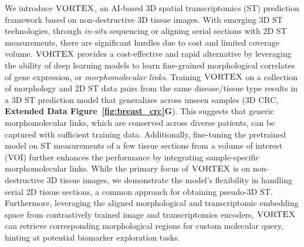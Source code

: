 
We introduce $\textsc{VORTEX}$, an AI-based 3D spatial transcriptomics (ST) prediction framework based on non-destructive 3D tissue images. 
With emerging 3D ST technologies, through \textit{in-situ} sequencing\cite{wang2018three, wang2021easi, fang2024three, sui2024scalable} or aligning serial sections with 2D ST measurements\cite{vickovic2022three, zeira2022alignment, zhou2023integrating,wang2023construction, lin2023multiplexed, schott2024open}, there are significant hurdles due to cost and limited coverage volume. $\textsc{VORTEX}$ provides a cost-effective and rapid alternative by leveraging the ability of deep learning models to learn fine-grained morphological correlates of gene expression, or \textit{morphomolecular links}.
Training $\textsc{VORTEX}$ on a collection of morphology and 2D ST data pairs from the same disease/tissue type results in a 3D ST prediction model that generalizes across unseen samples (3D CRC, \textbf{Extended Data Figure~\ref{fig:breast_crc}G}). This suggests that generic morphomolecular links, which are conserved across diverse patients, can be captured with sufficient training data. 
Additionally, fine-tuning the pretrained model on ST measurements of a few tissue sections from a volume of interest (VOI) further enhances the performance by integrating sample-specific morphomolecular links.
While the primary focus of $\textsc{VORTEX}$ is on non-destructive 3D tissue images, we demonstrate the model's flexibility in handling serial 2D tissue sections, a common approach for obtaining pseudo-3D ST.
Furthermore, leveraging the aligned morphological and transcriptomic embedding space from contrastively trained image and transcriptomics encoders, $\textsc{VORTEX}$ can retrieve corresponding morphological regions for custom molecular query, hinting at potential biomarker exploration tasks.


